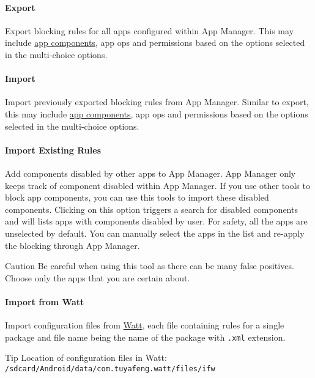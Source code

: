 
\paragraph{Export} Export blocking rules for all apps configured within App Manager. This may include
\hyperref[subsec:faq:what-are-app-components]{app components}, app ops and permissions based on the options selected in
the multi-choice options.

\paragraph{Import} Import previously exported blocking rules from App Manager. Similar to export, this may include
\hyperref[subsec:faq:what-are-app-components]{app components}, app ops and permissions based on the options selected in
the multi-choice options.

\paragraph{Import Existing Rules}
\label{par:import-existing-rules}
Add components disabled by other apps to App Manager. App Manager only keeps track of component disabled within
App Manager. If you use other tools to block app components, you can use this tools to import these disabled components.
Clicking on this option triggers a search for disabled components and will lists apps with components disabled by user.
For safety, all the apps are unselected by default. You can manually select the apps in the list and re-apply the
blocking through App Manager.

\begin{danger}{Caution}
    Be careful when using this tool as there can be many false positives. Choose only the apps that you are certain about.
\end{danger}

\paragraph{Import from Watt} Import configuration files from \href{https://github.com/tuyafeng/Watt}{Watt}, each file
containing rules for a single package and file name being the name of the package with \texttt{.xml} extension.

\begin{tip}{Tip}
    Location of configuration files in Watt: \texttt{/sdcard/Android/data/com.tuyafeng.watt/files/ifw}
\end{tip}

